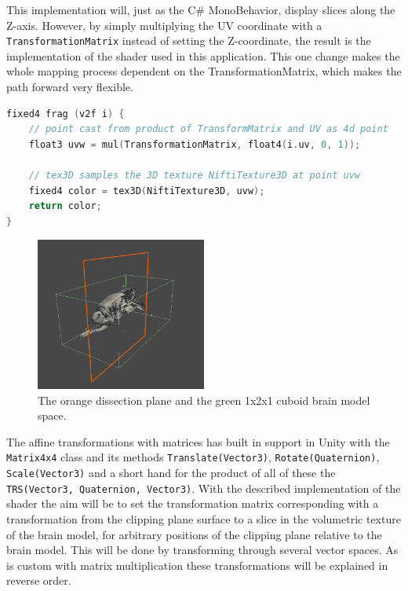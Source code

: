 This implementation will, just as the C\# MonoBehavior, display slices along the Z-axis. However, by simply multiplying the UV coordinate with a \texttt{TransformationMatrix} instead of setting the Z-coordinate, the result is the implementation of the shader used in this application. This one change makes the whole mapping process dependent on the TransformationMatrix, which makes the path forward very flexible.

\begin{lstlisting}[language=c]
fixed4 frag (v2f i) {
    // point cast from product of TransformMatrix and UV as 4d point
    float3 uvw = mul(TransformationMatrix, float4(i.uv, 0, 1));

    // tex3D samples the 3D texture NiftiTexture3D at point uvw
    fixed4 color = tex3D(NiftiTexture3D, uvw);
    return color;
}
\end{lstlisting}

\begin{figure}[ht]
    \centering
    \includegraphics[width=0.5\textwidth]{fig/dissection_boxplaneview.png}
    \caption{The orange dissection plane and the green 1x2x1 cuboid brain model space.}
    \label{fig:boxandplanedissect}
\end{figure}

The affine transformations with matrices has built in support in Unity with the \texttt{Matrix4x4} class and its methods \texttt{Translate(Vector3)}, \texttt{Rotate(Quaternion)}, \texttt{Scale(Vector3)} and a short hand for the product of all of these the \texttt{TRS(Vector3, Quaternion, Vector3)}. 
With the described implementation of the shader the aim will be to set the transformation matrix corresponding with a transformation from the clipping plane surface to a slice in the volumetric texture of the brain model, for arbitrary positions of the clipping plane relative to the brain model. This will be done by transforming through several vector spaces. As is custom with matrix multiplication these transformations will be explained in reverse order. 

